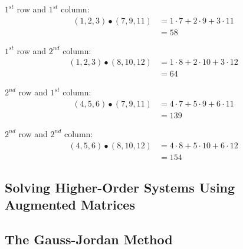         \noindent $1^{st}$ row and $1^{st}$ column: \\
        \begin{align*}
            (1,2,3) \bullet (7,9,11) &= 1\cdot 7 + 2\cdot 9 + 3\cdot 11 \\
            &= 58
        \end{align*}

        \noindent $1^{st}$ row and $2^{nd}$ column: \\
        \begin{align*}
            (1,2,3) \bullet (8,10,12) &= 1\cdot 8 +2\cdot 10+3\cdot 12 \\
            &= 64
        \end{align*}

        \noindent $2^{nd}$ row and $1^{st}$ column: \\
        \begin{align*}
            (4,5,6) \bullet (7,9,11) &= 4\cdot 7+5\cdot 9+6\cdot 11 \\
            &= 139
        \end{align*}

        \noindent $2^{nd}$ row and $2^{nd}$ column: \\
        \begin{align*}
            (4,5,6) \bullet (8,10,12) &= 4\cdot 8+5\cdot 10+6 \cdot 12 \\
            &= 154
        \end{align*}

    \subsection{Solving Higher-Order Systems Using Augmented Matrices}
    \subsection{The Gauss-Jordan Method}
